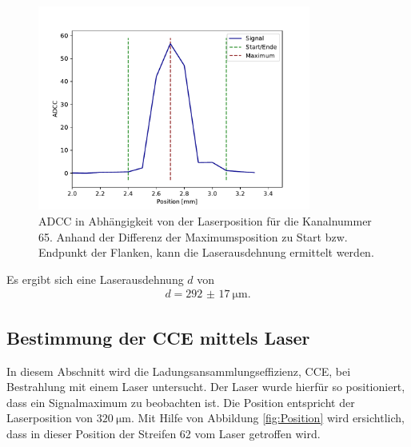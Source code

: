 \begin{figure}
  \centering
  \includegraphics[width=0.8\textwidth]{plots/Flanken.pdf}
  \caption{ADCC in Abhängigkeit von der Laserposition für die Kanalnummer 65. Anhand der Differenz der Maximumsposition zu Start bzw. Endpunkt der Flanken, kann die Laserausdehnung ermittelt werden.}
  \label{fig:Maxima}
\end{figure}
\FloatBarrier
Es ergibt sich eine Laserausdehnung $d$ von
\begin{align*}
  d = \SI{292(17)}{\micro\metre}.
\end{align*}

\subsection{Bestimmung der CCE mittels Laser}
\label{kap:CCEL}
In diesem Abschnitt wird die Ladungsansammlungseffizienz, CCE, bei Bestrahlung mit einem Laser untersucht. Der Laser wurde hierfür so positioniert, dass ein Signalmaximum zu beobachten ist. Die Position entspricht der Laserposition von $\SI{320}{\micro\metre}$. Mit Hilfe von Abbildung \ref{fig:Position} wird ersichtlich, dass in dieser Position der Streifen 62 vom Laser getroffen wird.

